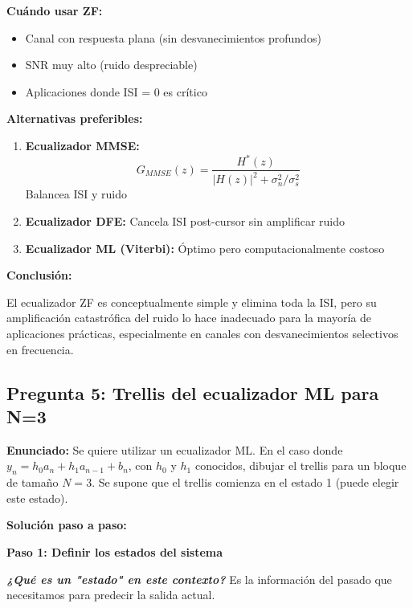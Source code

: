 \documentclass[11pt,a4paper]{article}
\begin{document}
\textbf{Cu\'ando usar ZF:}

\begin{itemize}
    \item Canal con respuesta plana (sin desvanecimientos profundos)
    \item SNR muy alto (ruido despreciable)
    \item Aplicaciones donde ISI = 0 es cr\'itico
\end{itemize}

\textbf{Alternativas preferibles:}

\begin{enumerate}
    \item \textbf{Ecualizador MMSE:}
    \[
    G_{MMSE}(z) = \frac{H^*(z)}{|H(z)|^2 + \sigma_n^2/\sigma_s^2}
    \]
    Balancea ISI y ruido
    
    \item \textbf{Ecualizador DFE:}
    Cancela ISI post-cursor sin amplificar ruido
    
    \item \textbf{Ecualizador ML (Viterbi):}
    \'Optimo pero computacionalmente costoso
\end{enumerate}

\textbf{Conclusi\'on:}

El ecualizador ZF es conceptualmente simple y elimina toda la ISI, pero su amplificaci\'on catastr\'ofica del ruido lo hace inadecuado para la mayor\'ia de aplicaciones pr\'acticas, especialmente en canales con desvanecimientos selectivos en frecuencia.



\newpage

\subsection*{Pregunta 5: Trellis del ecualizador ML para N=3}

\textbf{Enunciado:} Se quiere utilizar un ecualizador ML. En el caso donde $y_n = h_0 a_n + h_1 a_{n-1} + b_n$, con $h_0$ y $h_1$ conocidos, dibujar el trellis para un bloque de tama\~no $N = 3$. Se supone que el trellis comienza en el estado 1 (puede elegir este estado).

\vspace{0.3cm}
\textbf{Soluci\'on paso a paso:}

\textbf{Paso 1: Definir los estados del sistema}

\textit{\textbf{¿Qu\'e es un "estado" en este contexto?}} Es la informaci\'on del pasado que necesitamos para predecir la salida actual.
\end{document}
